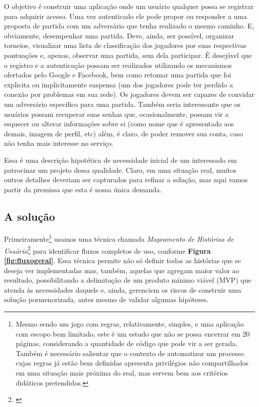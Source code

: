       O objetivo é construir uma aplicação onde um usuário qualquer possa se
      registrar para adquirir acesso. Uma vez autenticado ele pode propor ou
      responder a uma proposta de partida com um adversário que tenha realizado
      o mesmo caminho. E, obviamente, desempenhar uma partida. Deve, ainda, ser
      possível, organizar torneios, visualizar uma lista de classificação dos
      jogadores por suas respectivas pontuações e, apenas, observar uma partida,
      sem dela participar. É desejável que o registro e a autenticação possam
      ser realizados utilizando os mecanismos ofertados pelo Google e Facebook,
      bem como retomar uma partida que foi explicita ou implicitamente suspensa
      (um dos jogadores pode ter perdido a conexão por problemas em sua rede).
      Os jogadores devem ser capazes de convidar um adversário específico para
      uma partida. Também seria interessante que os usuários possam recuperar
      suas senhas que, ocasionalmente, possam vir a esquecer ou alterar
      informações sobre si (como nome que é apresentado aos demais, imagem de
      perfil, etc) além, é claro, de poder remover sua conta, caso não tenha
      mais interesse no serviço.

      Essa é uma descrição hipotética de necessidade inicial de um interessado
      em patrocinar um projeto dessa qualidade. Claro, em uma situação real,
      muitos outros detalhes deveriam ser capturados para refinar a solução, mas
      aqui vamos partir da premissa que esta é nossa única demanda.


    \subsection{A solução}

      Primeiramente\footnote{Mesmo sendo um jogo com regras, relativamente,
      simples, e uma aplicação com escopo bem limitado, este é um estudo que não
      se possa encerrar em 20 páginas, considerando a quantidade de código que
      pode vir a ser gerada. Também é necessário salientar que o contexto de
      automatizar um processo cujas regras já estão bem definidas apresenta
      privilégios não compartilhados em uma situação mais próxima do real, mas
      servem bem aos critérios didáticos pretendidos.}
      usamos uma técnica chamada
      \emph{Mapeamento de Histórias de Usuário}\footnote{\cite{Patton2014}}
      para identificar fluxos completos de uso, conforme
      \textbf{Figura \ref{fig:fluxogeral}}. Essa técnica permite não só definir
      todas as histórias que se deseja ver implementadas mas, também, aquelas
      que agregam maior valor ao resultado, possibilitando a delimitação de um
      produto mínimo viável (MVP) que atenda às necessidades daquele e, ainda,
      gerenciem os riscos de construir uma solução pormenorizada, antes mesmo de
      validar algumas hipóteses.

